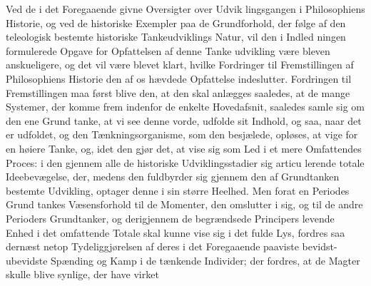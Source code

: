 %
Ved de i det Foregaaende givne Oversigter over Udvik\-%
lingsgangen i Philosophiens Historie, og ved de historiske
Exempler paa de Grundforhold, der følge af den teleologisk
bestemte historiske Tankeudviklings Natur, vil den i Indled\-%
ningen formulerede Opgave for Opfattelsen af denne Tanke\-%
udvikling være bleven anskueligere, og det vil være blevet
klart, hvilke Fordringer til Fremstillingen af Philosophiens
Historie den af os hævdede Opfattelse indeslutter. Fordringen
til Fremstillingen maa først blive den, at den skal anlægges
saaledes, at de mange Systemer, der komme frem indenfor
de enkelte Hovedafsnit, saaledes samle sig om den ene Grund\-%
tanke, at vi see denne vorde, udfolde sit Indhold, og saa,
naar det er udfoldet, og den Tænkningsorganisme, som den
besjælede, opløses, at vige for en høiere Tanke, og, idet den
gjør det, at vise sig som Led i et mere Omfattendes Proces:
i den gjennem alle de historiske Udviklingsstadier sig articu\-%
lerende totale Ideebevægelse, der, medens den fuldbyrder sig
gjennem den af Grundtanken bestemte Udvikling, optager
denne i sin større Heelhed. Men forat en Periodes Grund\-%
tankes Væsensforhold til de Momenter, den omslutter i sig,
og til de andre Perioders Grundtanker, og derigjennem de
begrændsede Principers levende Enhed i det omfattende Totale
skal kunne vise sig i det fulde Lys, fordres saa dernæst
netop Tydeliggjørelsen af deres i det Foregaaende paaviste
bevidst-ubevidste Spænding og Kamp i de tænkende Individer;
der fordres, at de Magter skulle blive synlige, der have virket
